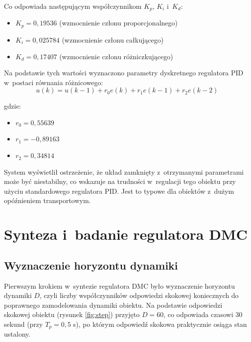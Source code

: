 \documentclass[a4paper,titlepage,11pt,floatssmall]{mwrep}
\begin{document}
Co odpowiada następującym współczynnikom $K_p$, $K_i$ i~$K_d$:
\begin{itemize}
    \item $K_p = 0,19536$ (wzmocnienie członu proporcjonalnego)
    \item $K_i = 0,025784$ (wzmocnienie członu całkującego)
    \item $K_d = 0,17407$ (wzmocnienie członu różniczkującego)
\end{itemize}

Na podstawie tych wartości wyznaczono parametry dyskretnego regulatora PID w~postaci równania różnicowego:
\begin{equation}
    u(k) = u(k-1) + r_0 e(k) + r_1 e(k-1) + r_2 e(k-2)
\end{equation}

gdzie:
\begin{itemize}
    \item $r_0 = 0,55639$
    \item $r_1 = -0,89163$
    \item $r_2 = 0,34814$
\end{itemize}

System wyświetlił ostrzeżenie, że układ zamknięty z~otrzymanymi parametrami może być niestabilny, co wskazuje na trudności w~regulacji tego obiektu przy użyciu standardowego regulatora PID. Jest to typowe dla obiektów z~dużym opóźnieniem transportowym.

\section{Synteza i~badanie regulatora DMC}

\subsection{Wyznaczenie horyzontu dynamiki}

Pierwszym krokiem w~syntezie regulatora DMC było wyznaczenie horyzontu dynamiki $D$, czyli liczby współczynników odpowiedzi skokowej koniecznych do poprawnego zamodelowania dynamiki obiektu. Na podstawie odpowiedzi skokowej obiektu (rysunek \ref{fig:step}) przyjęto $D = 60$, co odpowiada czasowi $30$ sekund (przy $T_p = 0,5$ s), po którym odpowiedź skokowa praktycznie osiąga stan ustalony.
\end{document}
